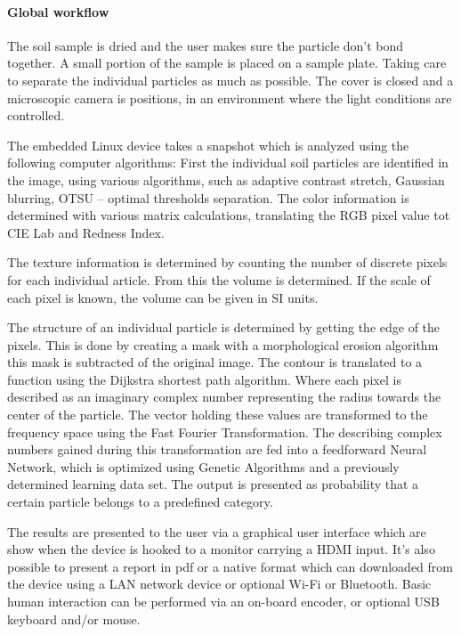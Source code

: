 \paragraph{Global workflow}
The soil sample is dried and the user makes sure the particle don’t bond together. A small portion of the sample is placed on a sample plate. Taking care to separate the individual particles as much as possible. The cover is closed and a microscopic camera is positions, in an environment where the light conditions are controlled.

The embedded Linux device takes a snapshot which is analyzed using the following computer algorithms: First the individual soil particles are identified in the image, using various algorithms, such as adaptive contrast stretch, Gaussian blurring, OTSU – optimal thresholds separation. The color information is determined with various matrix calculations, translating the RGB pixel value tot CIE Lab and Redness Index.

The texture information is determined by counting the number of discrete pixels for each individual article. From this the volume is determined. If the scale of each pixel is known, the volume can be given in SI units.

The structure of an individual particle is determined by getting the edge of the pixels. This is done by creating a mask with a morphological erosion algorithm this mask is subtracted of the original image. The contour is translated to a function using the Dijkstra shortest path algorithm. Where each pixel is described as an imaginary complex number representing the radius towards the center of the particle. The vector holding these values are transformed to the frequency space using the Fast Fourier Transformation. The describing complex numbers gained during this transformation are fed into a feedforward Neural Network, which is optimized using Genetic Algorithms and a previously determined learning data set. The output is presented as probability that a certain particle belongs to a predefined category.

The results are presented to the user via a graphical user interface which are show when the device is hooked to a monitor carrying a HDMI input. It’s also possible to present a report in pdf or a native format which can downloaded from the device using a LAN network device or optional Wi-Fi or Bluetooth. Basic human interaction can be performed via an on-board encoder, or optional USB keyboard and/or mouse.